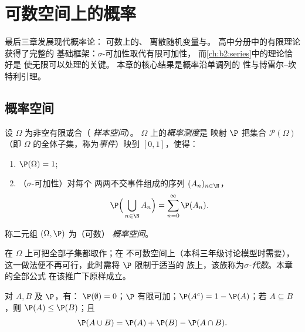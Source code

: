 \chapter{可数空间上的概率}\label{ch:b2:proba}

最后三章发展现代概率论：
可数上的、
离散随机变量与。
高中分册中的有限理论获得了完整的
基础框架：$\sigma$-可加性取代有限可加性，
而\cref{ch:b2:series}中的理论恰好是
使无限可以处理的关键。
本章的核心结果是概率沿单调列的
性与博雷尔--坎特利引理。

\section{概率空间}

\begin{definition}[可数概率空间]\label{def:b2:proba:space}
设 $\Omega$ 为非空有限或合（
\emph{样本空间}）。
$\Omega$ 上的\emph{概率测度}是
映射 $\P$ 把集合 $\mathcal{P}(\Omega)$
（即 $\Omega$ 的全体子集，称为\emph{事件}）映到 $[0, 1]$，使得：
\begin{enumerate}
\item $\P(\Omega) = 1$;
\item （$\sigma$-可加性）对每个
两两不交事件组成的序列 $(A_n)_{n\in\N}$，
\[
\P\Bigl(\,\bigcup_{n \in \N} A_n\Bigr)
= \sum_{n=0}^{\infty} \P(A_n) .
\]
\end{enumerate}
称二元组 $(\Omega, \P)$ 为（可数）
\emph{概率空间}。
\end{definition}

\begin{remark}
在 $\Omega$ 上可把全部子集都取作；在
不可数空间上（本科三年级讨论模型时需要），
这一做法便不再可行，此时需将 $\P$ 限制于适当的
族上，该族称为\emph{$\sigma$-代数}。本章的全部公式
在该推广下原样成立。
\end{remark}

\begin{proposition}[基本性质]\label{prop:b2:proba:rules}
对 $A, B$ 及 $\P$，有：
$\P(\emptyset) = 0$；$\P$ 有限可加；$\P(A^c) = 1 -
\P(A)$；若 $A \subseteq B$，则 $\P(A) \leq \P(B)$；且
\[
\P(A \cup B) = \P(A) + \P(B) - \P(A \cap B) .
\]
\end{proposition}

